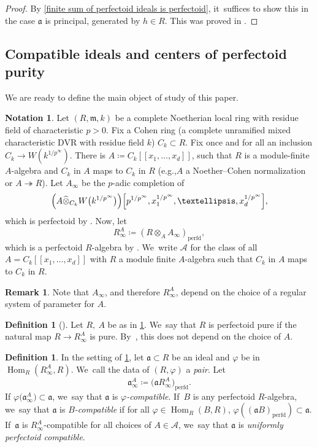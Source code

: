 \documentclass[11pt]{article}
\newcommand{\eg}{e.g.,\xspace}
\let\autoref\cref
\theoremstyle{plain}
\theoremstyle{definition}
\newtheorem{definition}[theorem]{Definition}
\newtheorem{remark}[theorem]{Remark}
\newtheorem{notation}[theorem]{Notation}
\numberwithin{equation}{theorem}
\let\infinity\infty
\let\tensor\otimes
\newcommand{\fra}{\mathfrak{a}}
\newcommand{\m}{\mathfrak{m}}
\DeclareMathOperator{\Hom}{Hom}
\newcommand{\perfd}{_{\mathrm{perfd}}}
\newcommand{\llbracket}{[\![}
\newcommand{\rrbracket}{]\!]}
\newcommand{\sA}{\mathcal{A}}
\renewcommand{\phi}{\varphi}
\newcommand{\unpfty}{{1/p^\infty}}
\newcommand{\rainfty}{R^A_\infty}
\newcommand{\rafty}{R^A_\infty}
\begin{document}
\begin{proof}
By \autoref{finite sum of perfectoid ideals is perfectoid}, it~suffices to show this in the case $\fra$ is principal, generated by $h\in R$. This was proved in \cite[Lem.\,2.4.3]{CaiLeeMaSchwedeTuckerPerfectoidSignature}.
\end{proof}

\subsection{Compatible ideals and centers of perfectoid purity} We are ready to define the main object of study of this paper.

\begin{notation}\label{notation rainfty}
Let $(R,\m, k)$ be a complete Noetherian local ring with residue field of characteristic $p>0$. Fix a Cohen ring (a complete unramified mixed characteristic DVR with residue field $k$) $C_k\subset R$. Fix once and for all an inclusion $C_k\to W(k^\unpfty)$.
There is $A\coloneqq C_k\llbracket x_1,\ldots,x_d\rrbracket$, such that $R$ is a module-finite $A$-algebra and $C_k$ in $A$ maps to $C_k$ in $R$ (\eg $A$ a Noether--Cohen normalization or $A\twoheadrightarrow R$). Let $A_\infty$ be the $p$-adic completion of
\[
\Bigl(A\widehat{\tensor}_{C_k} W\bigl(k^\unpfty\bigr)\Bigr)\Bigl[p^\unpfty,x_1^\unpfty,\ldots,x_d^\unpfty\Bigr],
\]
which is perfectoid by \cite[Ex.\,3.8\,(4)]{BhattIyengarMaRegularRings}. Now, let
\[
\rainfty\coloneqq (R\tensor_A A_\infty)\perfd,
\]
which is a perfectoid $R$\nobreakdash-algebra by \cite[Th.\,10.11]{BhattScholzePrisms}. We~write $\sA$ for the class of all $A=C_k\llbracket x_1,\ldots,x_d\rrbracket$ with $R$ a module finite $A$-algebra such that $C_k$ in $A$ maps to $C_k$ in $R$.
\end{notation}
\begin{remark}
Note that $A_\infinity$, and therefore $\rafty$, depend on the choice of a regular system of parameter for $A$.
\end{remark}

\begin{definition}[{\cite{BMPSTWWPerfectoidPure}}]
Let $R,\ A$ be as in \autoref{notation rainfty}. We~say that $R$ is perfectoid pure if the natural map $R\to \rafty$ is pure. By~\cite[Lem.\,4.23]{BMPSTWWPerfectoidPure}, this does not depend on the choice of $A$.
\end{definition}

\begin{definition}
In the setting of \autoref{notation rainfty}, let $\fra\subset R$ be an ideal and $\phi$ be in $\Hom_R(\rafty, R)$. We~call the data of $(R,\phi)$ a \emph{pair}.
Let
\[\fra^A_\infty\coloneqq\bigl(\fra\rafty\bigr)\perfd.
\]
If $\phi\bigl(\fra_\infty^A\bigr)\subset \fra$, we~say that
$\fra$ is \emph{$\phi$-compatible}. If~$B$ is any perfectoid $R$\nobreakdash-algebra, we~say that $\fra$ is \emph{$B$-compatible} if for all $\phi\in \Hom_R(B,R)$, $\phi((\fra B)\perfd)\subset \fra$. If~$\fra$ is $\rafty$\nobreakdash-compatible for all choices of $A\in \sA$, we~say that $\fra$ is \emph{uniformly perfectoid compatible}.
\end{definition}
\end{document}
